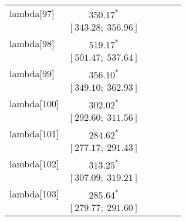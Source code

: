 \begin{table}
\begin{center}
\begin{tabular}{l c c c c c }
lambda[97]  & $350.17^{*}$                     &                           &                           &                         &                         \\
            & $[343.28;\ 356.96]$              &                           &                           &                         &                         \\
lambda[98]  & $519.17^{*}$                     &                           &                           &                         &                         \\
            & $[501.47;\ 537.64]$              &                           &                           &                         &                         \\
lambda[99]  & $356.10^{*}$                     &                           &                           &                         &                         \\
            & $[349.10;\ 362.93]$              &                           &                           &                         &                         \\
lambda[100] & $302.02^{*}$                     &                           &                           &                         &                         \\
            & $[292.60;\ 311.56]$              &                           &                           &                         &                         \\
lambda[101] & $284.62^{*}$                     &                           &                           &                         &                         \\
            & $[277.17;\ 291.43]$              &                           &                           &                         &                         \\
lambda[102] & $313.25^{*}$                     &                           &                           &                         &                         \\
            & $[307.09;\ 319.21]$              &                           &                           &                         &                         \\
lambda[103] & $285.64^{*}$                     &                           &                           &                         &                         \\
            & $[279.77;\ 291.60]$              &                           &                           &                         &                         \\

\end{tabular}
\end{center}
\end{table}
